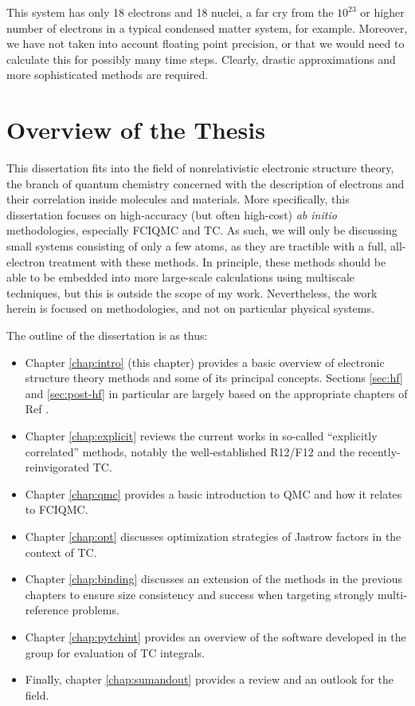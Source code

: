 This system has only 18 electrons and 18 nuclei, a far cry from the $10^{23}$ or higher number of electrons in a typical condensed matter system, for example. Moreover, we have not taken into account floating point precision, or that we would need to calculate this for possibly many time steps. Clearly, drastic approximations and more sophisticated methods are required.

\section{Overview of the Thesis}

This dissertation fits into the field of nonrelativistic electronic structure theory, the branch of quantum chemistry concerned with the description of electrons and their correlation inside molecules and materials. More specifically, this dissertation focuses on high-accuracy (but often high-cost) \emph{ab initio} methodologies, especially \gls{FCIQMC} and \gls{TC}. As such, we will only be discussing small systems consisting of only a few atoms, as they are tractible with a full, all-electron treatment with these methods. In principle, these methods should be able to be embedded \cite{jonesEmbedding2020,christlmaierFull2022} into more large-scale calculations using multiscale techniques, but this is outside the scope of my work. Nevertheless, the work herein is focused on methodologies, and not on particular physical systems.

The outline of the dissertation is as thus:
\begin{itemize}
    \item Chapter \ref{chap:intro} (this chapter) provides a basic overview of electronic structure theory methods and some of its principal concepts. Sections \ref{sec:hf} and \ref{sec:post-hf} in particular are largely based on the appropriate chapters of Ref .
    \item Chapter \ref{chap:explicit} reviews the current works in so-called ``explicitly correlated'' methods, notably the well-established R12/F12 and the recently-reinvigorated \gls{TC}.
    \item Chapter \ref{chap:qmc} provides a basic introduction to \gls{QMC} and how it relates to \gls{FCIQMC}.
    \item Chapter \ref{chap:opt} discusses optimization strategies of Jastrow factors in the context of \gls{TC}.
    \item Chapter \ref{chap:binding} discusses an extension of the methods in the previous chapters to ensure size consistency and success when targeting strongly multi-reference problems.
    \item Chapter \ref{chap:pytchint} provides an overview of the software \pytchint developed in the group for evaluation of \gls{TC} integrals.
    \item Finally, chapter \ref{chap:sumandout} provides a review and an outlook for the field.
\end{itemize}


